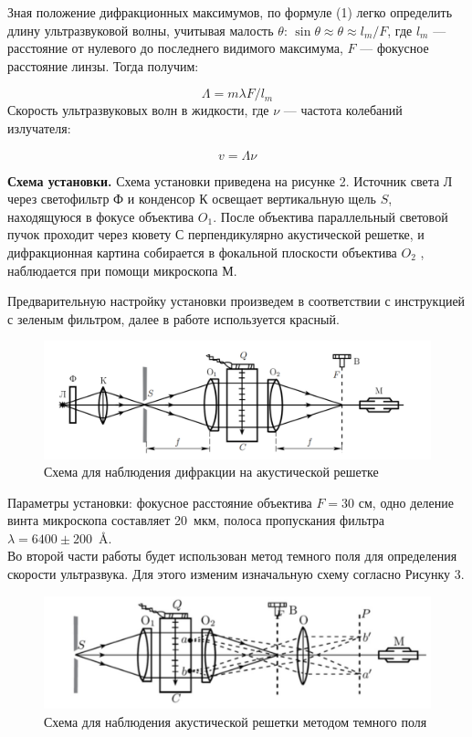 \documentclass{article}
\begin{document}
    Зная положение дифракционных максимумов, по формуле (1) легко определить длину ультразвуковой волны, учитывая малость $ \theta $: $ \sin \theta \approx \theta \approx l_m /F  $, где $ l_m $ --- расстояние от нулевого до последнего видимого максимума, $ F $ --- фокусное расстояние линзы. Тогда получим:
    	
    	\begin{equation}\label{}
    	 \Lambda = m \lambda F/ l_m 
    	\end{equation}
    	Скорость ультразвуковых волн в жидкости, где $ \nu $ --- частота колебаний излучателя:
    	
    \begin{equation}\label{}
    	v = \Lambda \nu 
    \end{equation}
    
    \textbf{Схема установки. }Схема установки приведена на рисунке 2. Источник света Л через светофильтр Ф и конденсор К освещает вертикальную щель $ S $, находящуюся в фокусе объектива $ O_1 $. После объектива параллельный световой пучок проходит через кювету С перпендикулярно акустической решетке, и дифракционная картина собирается в фокальной плоскости объектива $ O_2 $ , наблюдается при помощи микроскопа М.

    Предварительную настройку установки произведем в соответствии с инструкцией с зеленым фильтром, далее в работе используется красный.
    
\begin{figure}[h!]
	\includegraphics[scale=0.3]{stand.png}
	\centering
	\caption{Схема для наблюдения дифракции на акустической решетке}
\end{figure}

 Параметры установки: фокусное расстояние объектива $F = 30 $ см, одно деление винта микроскопа составляет 20~мкм, полоса пропускания фильтра \mbox{$\lambda = 6400\pm 200$ Å}.
 \\ Во второй части работы будет использован метод темного поля для определения скорости ультразвука. Для этого изменим изначальную схему
согласно Рисунку 3.
 \begin{figure}[h!]
	\includegraphics[scale=0.3]{tteo.jpg}
	\centering
	\caption{Схема для наблюдения акустической решетки методом темного поля }
\end{figure}
	
\end{document}
